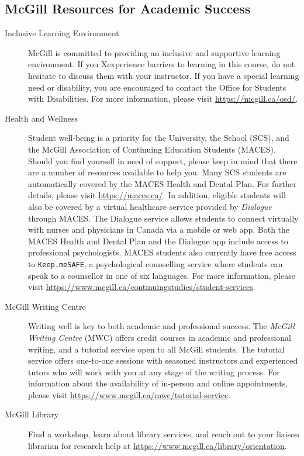 \documentclass{article}
\begin{document}
\subsection{McGill Resources for Academic Success}

\begin{description}
\item[Inclusive Learning Environment]{McGill is committed to providing
  an inclusive and supportive learning environment. If you Xexperience
  barriers to learning in this course, do not hesitate to discuss them
  with your instructor. If you have a special learning need or
  disability, you are encouraged to contact the Office for Students
  with Disabilities. For more information, please visit
  \url{https://mcgill.ca/osd/}.}
\item[Health and Wellness]{Student well-being is a priority for the
  University, the School (SCS), and the McGill Association of
  Continuing Education Students (MACES). Should you find yourself in
  need of support, please keep in mind that there are a number of
  resources available to help you. Many SCS students are automatically
  covered by the MACES Health and Dental Plan. For further details,
  please visit \url{https://maces.ca/}. In addition, eligible students
  will also be covered by a virtual healthcare service provided by
  {\em Dialogue} through MACES. The Dialogue service allows students
  to connect virtually with nurses and physicians in Canada via a
  mobile or web app. Both the MACES Health and Dental Plan and the
  Dialogue app include access to professional psychologists. MACES
  students also currently have free access to \texttt{Keep.meSAFE}, a
  psychological counselling service where students can speak to a
  counsellor in one of six languages. For more information, please
  visit
  \url{https://www.mcgill.ca/continuingstudies/student-services}.}
\item[McGill Writing Centre]{Writing well is key to both academic and
  professional success. The {\em McGill Writing Centre} (MWC) offers
  credit courses in academic and professional writing, and a tutorial
  service open to all McGill students. The tutorial service offers
  one-to-one sessions with seasoned instructors and experienced tutors
  who will work with you at any stage of the writing process.  For
  information about the availability of in-person and online
  appointments, please visit
  \url{https://www.mcgill.ca/mwc/tutorial-service}.}
\item[McGill Library]{Find a workshop, learn about library services,
  and reach out to your liaison librarian for research help at
  \url{https://www.mcgill.ca/library/orientation}.}
\end{description}
\end{document}
